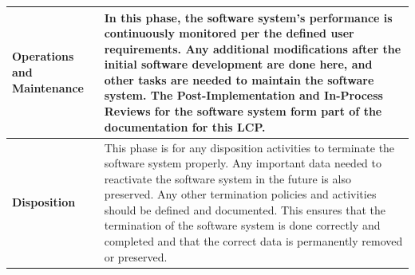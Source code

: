 \begin{xltabular}{\textwidth}{|l|X|}
	\textbf{Operations and Maintenance} & In this phase, the software system's performance is continuously monitored per the defined user requirements. Any additional modifications after the initial software development are done here, and other tasks are needed to maintain the software system. The Post-Implementation and In-Process Reviews for the software system form part of the documentation for this LCP. \\ \hline
	\textbf{Disposition} & This phase is for any disposition activities to terminate the software system properly. Any important data needed to reactivate the software system in the future is also preserved. Any other termination policies and activities should be defined and documented. This ensures that the termination of the software system is done correctly and completed and that the correct data is permanently removed or preserved. \\
\end{xltabular}

